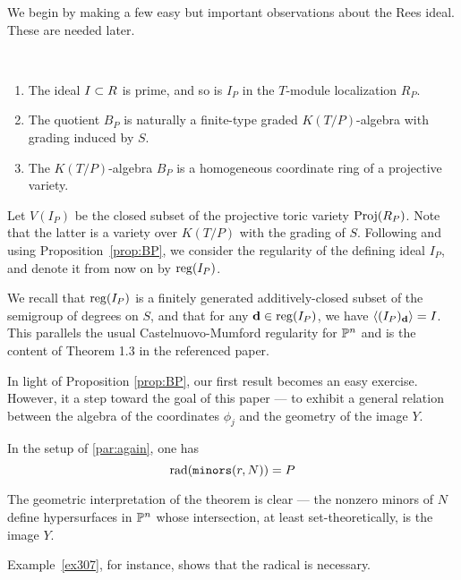 \documentclass[fleqn,reqno]{amsart}
\numberwithin{first}{chapter}
\begin{document}
\begin{paragraf*}
We begin by making a few easy but important observations about the Rees ideal.
These are needed later.
\end{paragraf*}

\begin{proposition}
\label{prop:BP}~
\begin{enumerate}[label=\normalfont(\alph*)]
\item
The ideal $I\subset R$ is prime, and so is $I_P$ in the $T$-module localization $R_P$.

\item
The quotient $B_P$ is naturally a finite-type graded $K(T/P)$-algebra with grading induced by $S$.

\item\label{itm:BPKTP-alg}
The $K(T/P)$-algebra $B_P$ is a homogeneous coordinate ring of a projective variety.
\end{enumerate}
\end{proposition}

\begin{paragraf}
\label{par:reg-IP}
Let $V(I_P)$ be the closed subset of the projective toric variety $\operatorname{Proj}(R_P)$.
Note that the latter is a variety over $K(T/P)$ with the grading of $S$.
Following \citet{MS-04} and using Proposition~\ref{prop:BP},
we consider the regularity of the defining ideal $I_P$,
and denote it from now on by $\operatorname{reg}(I_P)$.

We recall that $\operatorname{reg}(I_P)$ is a finitely generated additively-closed subset
of the semigroup of degrees on $S$, and that
for any $\mathbf d\in\operatorname{reg}(I_P)$, we have $\langle(I_P)_\mathbf d\rangle=I$.
This parallels the usual Castelnuovo-Mumford regularity for $\mathbb{P}^n$
and is the content of Theorem 1.3 in the referenced paper.
\end{paragraf}

\begin{paragraf*}
In light of Proposition \ref{prop:BP}, our first result becomes an easy exercise.
However, it a step toward the goal of this paper --- to exhibit a general relation between
the algebra of the coordinates $\phi_j$ and the geometry of the image $Y$.
\end{paragraf*}

\begin{theorem}
\label{thm:rad-minors}
In the setup of \eqref{par:again}, one has
\[
	\operatorname{rad}(\mathop{\tt minors}(r,N))=P
\]
\end{theorem}

\begin{paragraf*}
The geometric interpretation of the theorem is clear ---
the nonzero minors of $N$ define hypersurfaces in $\mathbb{P}^n$ whose intersection,
at least set-theoretically, is the image $Y$.

Example~\ref{ex307}, for instance, shows that the radical is necessary.
\end{paragraf*}
\end{document}
